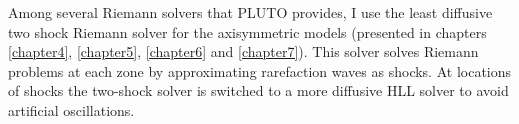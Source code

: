%
%
%
 
Among several Riemann solvers that PLUTO provides, I use the least diffusive two shock Riemann solver \citep{mignone05} for the axisymmetric models (presented in chapters \ref{chapter4}, \ref{chapter5}, \ref{chapter6} and \ref{chapter7}). This solver solves Riemann problems at each zone by approximating rarefaction waves as shocks. 
At locations of shocks the two-shock solver is switched to a more diffusive HLL solver to avoid artificial oscillations.

